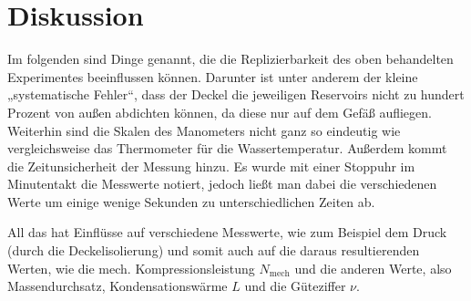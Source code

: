 \section{Diskussion}
\label{sec:Diskussion}

Im folgenden sind Dinge genannt, die die Replizierbarkeit des oben behandelten Experimentes beeinflussen können.
Darunter ist unter anderem der kleine „systematische Fehler“, dass der Deckel die jeweiligen Reservoirs nicht
zu hundert Prozent von außen abdichten können, da diese nur auf dem Gefäß aufliegen.
Weiterhin sind die Skalen des Manometers nicht ganz so eindeutig wie vergleichsweise das Thermometer für die Wassertemperatur.
Außerdem kommt die Zeitunsicherheit der Messung hinzu.
Es wurde mit einer Stoppuhr im Minutentakt die Messwerte notiert, jedoch ließt man dabei die verschiedenen Werte
um einige wenige Sekunden zu unterschiedlichen Zeiten ab.

All das hat Einflüsse auf verschiedene Messwerte, wie zum Beispiel dem Druck (durch die Deckelisolierung) und
somit auch auf die daraus resultierenden Werten, wie die mech. Kompressionsleistung $N_\text{mech}$ und 
die anderen Werte, also Massendurchsatz, Kondensationswärme $L$ und die Güteziffer $\nu$.